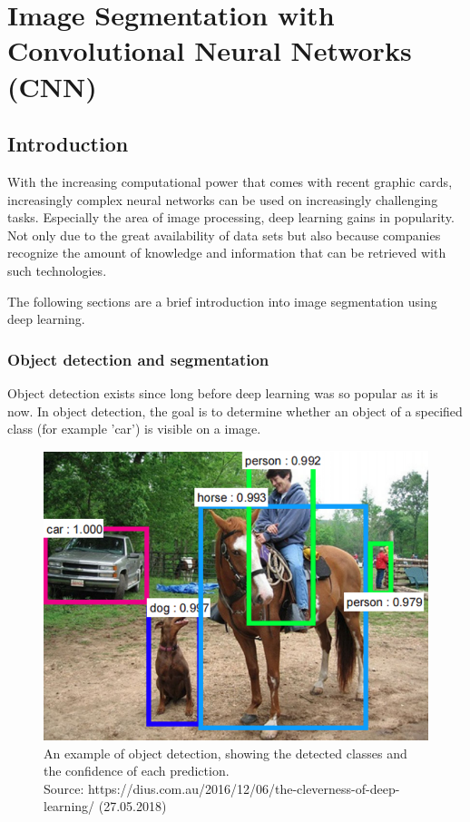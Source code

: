 
\chapter{Image Segmentation with Convolutional Neural Networks (CNN)}
\section{Introduction}
With the increasing computational power that comes with recent graphic cards, increasingly complex neural networks can be used on increasingly challenging tasks. Especially the area of image processing, deep learning gains in popularity. Not only due to the great availability of data sets but also because companies recognize the amount of knowledge and information that can be retrieved with such technologies.

The following sections are a brief introduction into image segmentation using deep learning.

\subsection{Object detection and segmentation}
Object detection exists since long before deep learning was so popular as it is now. In object detection, the goal is to determine whether an object of a specified class (for example 'car') is visible on a image. 

\begin{figure}[H]
    \centering
	\includegraphics[width=0.6\linewidth]{chapters/neural_networks/images/object_detection.png}
	\caption{An example of object detection, showing the detected classes and the confidence of each prediction.\\ Source: https://dius.com.au/2016/12/06/the-cleverness-of-deep-learning/ (27.05.2018)}
	\label{fig:neural_networks:object_detection}
\end{figure}

